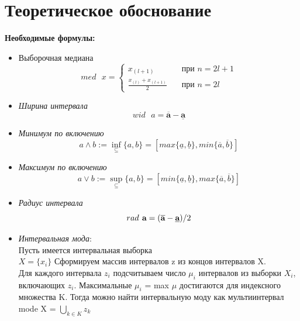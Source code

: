 \documentclass[a4paper,12pt]{article}
\begin{document}
\section{Теоретическое обоснование}
\textbf{Необходимые формулы:}
\begin{itemize}
\item Выборочная медиана
 \begin{equation*}
 med \text{ } x=\begin{cases} 
    x_{(l+1)}      & \quad \text{при } n = 2l+1 \\
    \frac{x_{(l)}+x_{(l+1)}}{2} & \quad \text{при } n = 2l 
  \end{cases}
 \end{equation*}
    \item \textit{Ширина интервала}
    \begin{equation*}
    wid \textbf{ }a=\overline{\textbf{a}}-\underline{\mathbf{a}}
    \end{equation*}
 \item \textit{Минимум по включению}
    \begin{equation*}
    a \wedge b := \inf_{\subseteq} \{a,b\} = [max\{\underline{a},\underline{b}\}, min \{\overline{a},\overline{b}\}]
    \end{equation*}
    \item \textit{Максимум по включению}
    \begin{equation*}
    a \vee b := \sup_{\subseteq} \{a,b\} = [min\{\underline{a},\underline{b}\}, max \{\overline{a},\overline{b}\}]
    \end{equation*}
    \item \textit{Радиус интервала}
    \begin{equation*}
 rad \textbf{ a}=(\overline{\textbf{a}}-\textbf{\underline{a}})/2
 \end{equation*}

\item \textit{Интервальная мода}:\\
Пусть имеется интервальная выборка\\
$X = \lbrace x_i \rbrace$
Сформируем массив интервалов z из концов интервалов X.
\\Для каждого интервала $z_i$ подсчитываем число $\mu _i$ интервалов из выборки $X_i$, включающих $z_i$. Максимальные $\mu _i$ = max $\mu$ достигаются для индексного множества K. Тогда можно найти
интервальную моду как мультиинтервал\\
mode X = $\bigcup_{k \in K}{z_k}$


\end{itemize}
\end{document}
